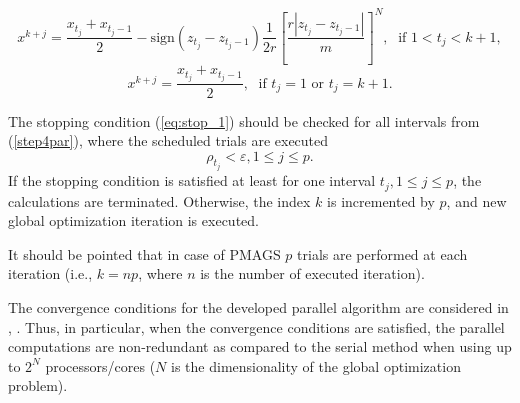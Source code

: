 \documentclass{naco}
\theoremstyle{definition}
\begin{document}
\begin{equation} \label{step5par}
x^{k+j}=\frac{x_{t_j}+x_{t_j-1}}{2}-\mathrm{sign}(z_{t_j}-z_{t_j-1})\frac{1}{2r}\left[\frac{r|z_{t_j}-z_{t_j-1}|}{m}\right]^N,\; \textrm{ if } 1<t_j<k+1,
\end{equation}
\[
x^{k+j}=\frac{x_{t_j}+x_{t_j-1}}{2},\; \textrm{ if } t_j=1 \textrm{ or } t_j=k+1.
\]
\par
The stopping condition (\ref{eq:stop_1}) should be checked for all intervals from (\ref{step4par}),
where the scheduled trials are executed
\begin{equation}
  \label{eq:stop}
\rho_{t_j}<\varepsilon,1\leq j\leq p.
\end{equation}
If the stopping condition is satisfied at least for one interval \(t_j, 1\le j\le p\), the calculations
are terminated. Otherwise, the index \(k\) is incremented by \(p\), and new global optimization iteration is executed.

It should be pointed that in case of PMAGS $p$ trials are performed at each iteration (i.e., $k=np$, where $n$ is the number of executed iteration).

The convergence conditions for the developed parallel algorithm are considered
in \cite{stronginGergelBarkalovParGO}, \cite{strSergGO}. Thus, in particular, when the convergence conditions are
satisfied, the parallel computations are non-redundant as compared to the serial method
when using up to \(2^N\) processors/cores (\(N\) is the dimensionality of the global optimization problem).
\end{document}
